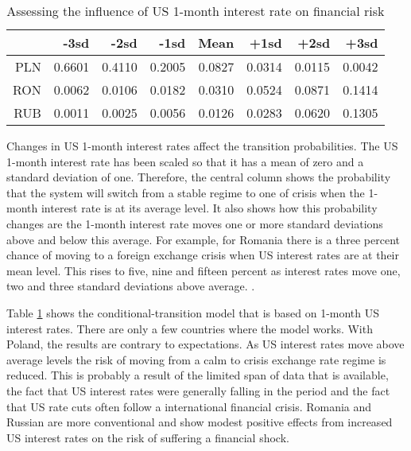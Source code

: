 \documentclass[12pt, a4paper, oneside]{article}\usepackage[]{graphicx}\usepackage[]{color}
\begin{document}
\begin{table}[t]
\begin{threeparttable}
\centering
\begin{tabular}{rrrrrrrr}
  \hline
 & -3sd & -2sd & -1sd & Mean & +1sd & +2sd & +3sd \\ 
  \hline
  PLN & 0.6601 & 0.4110 & 0.2005 & 0.0827 & 0.0314 & 0.0115 & 0.0042 \\
  RON & 0.0062 & 0.0106 & 0.0182 & 0.0310 & 0.0524 & 0.0871 & 0.1414 \\ 
  RUB & 0.0011 & 0.0025 & 0.0056 & 0.0126 & 0.0283 & 0.0620 & 0.1305 \\
   \hline
\end{tabular}
\begin{tablenotes}
\small
\item Changes in US 1-month interest rates affect the transition probabilities.  The US 1-month interest rate has been scaled so that it has a mean of zero and a standard deviation of one.  Therefore, the central column shows the probability that the system will switch from a stable regime to one of crisis when the 1-month interest rate is at its average level.  It also shows how this probability changes are the 1-month interest rate moves one or more standard deviations above and below this average. For example, for Romania there is a three percent chance of moving to a foreign exchange crisis when US interest rates are at their mean level.  This rises to five, nine and fifteen percent as interest rates move one, two and three standard deviations above average. .  
\end{tablenotes}
\caption{Assessing the influence of US 1-month interest rate on financial risk} 
\label{tabref:1mtranprob}
\end{threeparttable}
\end{table}

Table \ref{tabref:1mtranprob} shows the conditional-transition model that is based on 1-month US interest rates.  There are only a few countries where the model works.  With Poland, the results are contrary to expectations.  As US interest rates move above average levels the risk of moving from a calm to crisis exchange rate regime is reduced.  This is probably a result of the limited span of data that is available, the fact that US interest rates were generally falling in the period and the fact that US rate cuts often follow a international financial crisis.  Romania and Russian are more conventional and show modest positive effects from increased US interest rates on the risk of suffering a financial shock.
\end{document}

